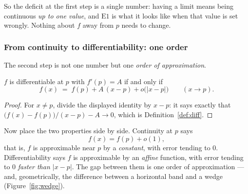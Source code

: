 So the deficit at the first step is a single number: having a limit means
being continuous \emph{up to one value}, and $\mathrm{E}1$ is what it looks
like when that value is set wrongly. Nothing about $f$ away from $p$ needs to
change.

\subsubsection*{From continuity to differentiability: one order}

The second step is not one number but one \emph{order of approximation}.

\begin{theorem}\label{thm:affine}
$f$ is differentiable at $p$ with $f'(p)=A$ if and only if
\[ f(x) \;=\; f(p) + A\,(x-p) + o\bigl(|x-p|\bigr)
   \qquad (x \to p). \]
\end{theorem}

\begin{proof}
For $x \ne p$, divide the displayed identity by $x-p$: it says exactly that
$\bigl(f(x)-f(p)\bigr)/(x-p) - A \to 0$, which is
Definition~\ref{def:diff}.
\end{proof}

Now place the two properties side by side. Continuity at $p$ says
\[ f(x) = f(p) + o(1), \]
that is, $f$ is approximable near $p$ by a \emph{constant}, with error
tending to $0$. Differentiability says $f$ is approximable by an
\emph{affine} function, with error tending to $0$ \emph{faster than
$|x-p|$}. The gap between them is one order of approximation --- and,
geometrically, the difference between a horizontal band and a wedge
(Figure~\ref{fig:wedge}).

